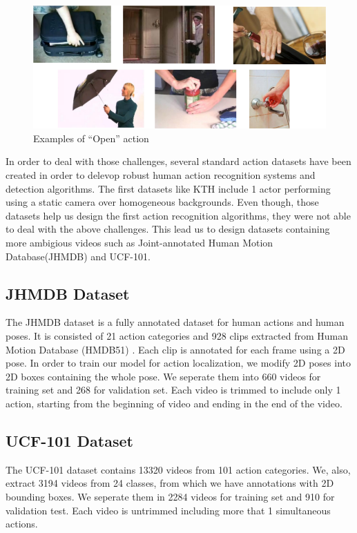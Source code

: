 \documentclass{report}
\begin{document}
\begin{figure}[h]
  \centering
  \includegraphics[scale=0.3]{open_example}
  \caption{Examples of ``Open'' action}
  \label{fig:open_example}

\end{figure}

In order to deal with those challenges, several standard action datasets have been created in order to delevop
robust human action recognition systems and detection algorithms.
The first datasets like KTH\cite{} include 1 actor performing using a static camera over homogeneous backgrounds.
Even though, those datasets help us design the first action recognition algorithms, they were not able to deal with the above
challenges.
This lead us to design datasets containing more ambigious videos such as Joint-annotated Human Motion Database(JHMDB)\cite{}
and UCF-101\cite{}.
\subsection{JHMDB Dataset}
The JHMDB dataset is a fully annotated dataset for human actions and human poses. It is consisted of 21 action categories and 928
clips extracted from Human Motion Database (HMDB51) \cite{}. Each clip is annotated for each frame using a 2D pose.
In order to train our model for action localization, we modify 2D poses into 2D boxes containing the whole pose. We seperate them
into 660 videos for training set and 268 for validation set. Each video is trimmed to include only 1 action, starting from the beginning
of video and ending in the end of the video. 

\subsection{UCF-101 Dataset}
The UCF-101 dataset contains 13320 videos from 101 action categories. We, also, extract 3194 videos from 24 classes, from which
we have annotations with 2D bounding boxes. We seperate them in 2284 videos for training set and 910 for validation test. Each video
is untrimmed including more that 1 simultaneous actions. 
\end{document}
